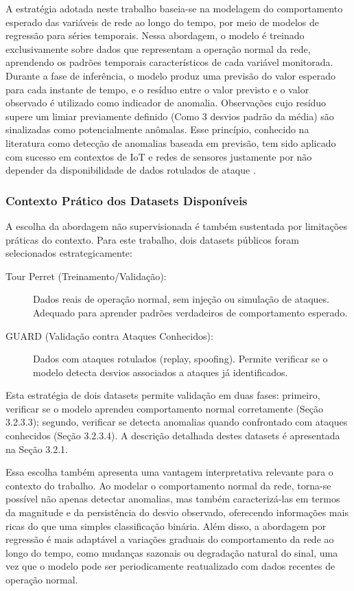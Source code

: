 A estratégia adotada neste trabalho baseia-se na modelagem do comportamento 
esperado das variáveis de rede ao longo do tempo, por meio de modelos de 
regressão para séries temporais. Nessa abordagem, o modelo é treinado 
exclusivamente sobre dados que representam a operação normal da rede, 
aprendendo os padrões temporais característicos de cada variável monitorada. Durante a fase de inferência, o modelo produz uma previsão do valor esperado 
para cada instante de tempo, e o resíduo entre o valor previsto e o valor 
observado é utilizado como indicador de anomalia. Observações cujo resíduo 
supere um limiar previamente definido (Como 3 desvios padrão da média) são sinalizadas como potencialmente 
anômalas. Esse princípio, conhecido na literatura como detecção de anomalias 
baseada em previsão, tem sido aplicado com sucesso em contextos de IoT e 
redes de sensores justamente por não depender da disponibilidade de dados 
rotulados de ataque \cite{chalapathy2019}.


\subsubsection{Contexto Prático dos Datasets Disponíveis}

A escolha da abordagem não supervisionada é também sustentada por 
limitações práticas do contexto. Para este trabalho, dois datasets 
públicos foram selecionados estrategicamente:

\begin{description}
    \item[Tour Perret (Treinamento/Validação):] Dados reais de operação 
    normal, sem injeção ou simulação de ataques. Adequado para aprender 
    padrões verdadeiros de comportamento esperado.
    
    \item[GUARD (Validação contra Ataques Conhecidos):] Dados com ataques 
    rotulados (replay, spoofing). Permite verificar se o modelo detecta 
    desvios associados a ataques já identificados.
\end{description}

Esta estratégia de dois datasets permite validação em duas fases: 
primeiro, verificar se o modelo aprendeu comportamento normal 
corretamente (Seção 3.2.3.3); segundo, verificar se detecta anomalias 
quando confrontado com ataques conhecidos (Seção 3.2.3.4). A descrição 
detalhada destes datasets é apresentada na Seção 3.2.1.


Essa escolha também apresenta uma vantagem interpretativa relevante para o 
contexto do trabalho. Ao modelar o comportamento normal da rede, torna-se 
possível não apenas detectar anomalias, mas também caracterizá-las em termos 
da magnitude e da persistência do desvio observado, oferecendo informações 
mais ricas do que uma simples classificação binária. Além disso, a abordagem 
por regressão é mais adaptável a variações graduais do comportamento da rede 
ao longo do tempo, como mudanças sazonais ou degradação natural do sinal, 
uma vez que o modelo pode ser periodicamente reatualizado com dados recentes 
de operação normal.

